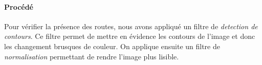 	\paragraph{Procédé}	
		Pour vérifier la présence des routes, nous avons appliqué un filtre de \emph{detection de contours}. Ce filtre permet de mettre en évidence les contours de l'image et donc les changement brusques de couleur. On applique ensuite un filtre de \emph{normalisation} permettant de rendre l'image plus lisible.